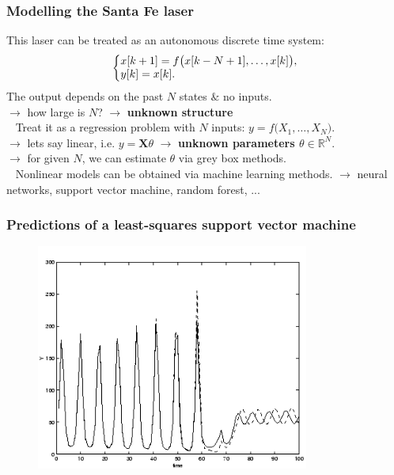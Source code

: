 \begin{frame}
	\frametitle{Modelling the Santa Fe laser}
	This laser can be treated as an autonomous discrete time system:
	\begin{align*}
	\left\{ \begin{matrix} 
	x[k+1] = f\big(x[k-N+1], \ldots, x[k]\big), \\
	y[k] = x[k]. \hfill
	\end{matrix}\right.
	\end{align*}
	The output depends on the past $N$ states $\&$ no inputs.\\
	\pause
	$\rightarrow$ how large is $N$? $\rightarrow$ \textbf{unknown structure} \\
	\ \newline
	\pause
	Treat it as a regression problem with $N$ inputs: $y = f\big(X_1,\ldots,X_N\big)$. \\
	\pause
	$\rightarrow$ lets say linear, i.e. $y = \mathbf{X}\theta$ $\rightarrow$ \textbf{unknown parameters $\theta \in \mathbb{R}^N$}. \\
	\pause
	$\rightarrow$ for given $N$, we can estimate $\theta$ via grey box methods.\\
	\ \newline
	\pause
	Nonlinear models can be obtained via machine learning methods.
	$\rightarrow$ neural networks, support vector machine, random forest, ...
\end{frame}

\begin{frame}
	\frametitle{Predictions of a least-squares support vector machine}
	\begin{figure}[!h]
		\centering
		\includegraphics[width=0.8\textwidth]{img/santafe-prediction.png}
	\end{figure}
\end{frame}


